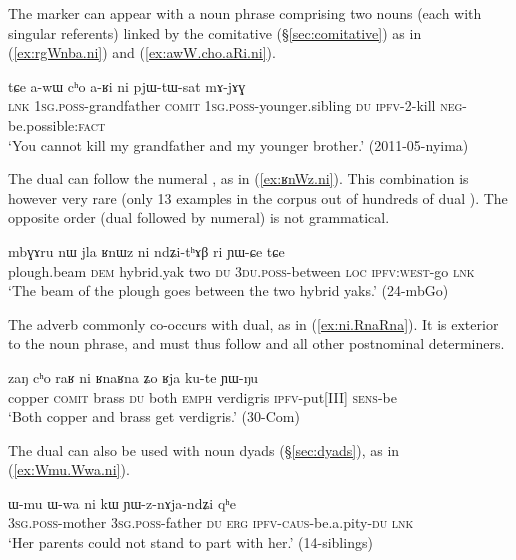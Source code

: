 The marker  can appear with a noun phrase comprising two nouns (each with singular referents) linked by the comitative  (§\ref{sec:comitative}) as in (\ref{ex:rgWnba.ni}) and (\ref{ex:awW.cho.aRi.ni}).

\begin{exe}
	\ex \label{ex:awW.cho.aRi.ni}
	\gll  tɕe a-wɯ cʰo a-ʁi ni pjɯ-tɯ-sat mɤ-jɤɣ \\
	\textsc{lnk} \textsc{1sg}.\textsc{poss}-grandfather \textsc{comit} \textsc{1sg}.\textsc{poss}-younger.sibling \textsc{du} \textsc{ipfv}-2-kill \textsc{neg}-be.possible:\textsc{fact} \\
	\glt `You cannot kill my grandfather and my younger brother.' (2011-05-nyima)
\end{exe}

The dual can follow the numeral , as in (\ref{ex:ʁnWz.ni}). This combination is however very rare (only 13 examples in the corpus out of hundreds of dual ). The opposite order (dual followed by numeral) is not grammatical.

\begin{exe}
\ex \label{ex:ʁnWz.ni}
\gll mbɣɤru nɯ jla ʁnɯz ni ndʑi-tʰɤβ ri ɲɯ-ɕe tɕe \\
plough.beam \textsc{dem} hybrid.yak two \textsc{du} \textsc{3du}.\textsc{poss}-between \textsc{loc} \textsc{ipfv}:\textsc{west}-go \textsc{lnk} \\
\glt `The beam of the plough goes between the two hybrid yaks.' (24-mbGo)
\end{exe}


The adverb  commonly co-occurs with dual, as in (\ref{ex:ni.RnaRna}). It is exterior to the noun phrase, and must thus follow  and all other postnominal determiners.

\begin{exe}
\ex \label{ex:ni.RnaRna}
\gll zaŋ cʰo raʁ ni ʁnaʁna ʑo ʁja ku-te ɲɯ-ŋu \\
copper \textsc{comit} brass \textsc{du} both \textsc{emph} verdigris \textsc{ipfv}-put[III] \textsc{sens}-be \\
\glt `Both copper and brass get verdigris.' (30-Com)
\end{exe}

The dual can also be used with noun dyads (§\ref{sec:dyads}), as in (\ref{ex:Wmu.Wwa.ni}). 

\begin{exe}
\ex \label{ex:Wmu.Wwa.ni}
\gll   ɯ-mu ɯ-wa ni kɯ ɲɯ-z-nɤja-ndʑi qʰe \\
\textsc{3sg}.\textsc{poss}-mother \textsc{3sg}.\textsc{poss}-father \textsc{du} \textsc{erg} \textsc{ipfv}-\textsc{caus}-be.a.pity-\textsc{du} \textsc{lnk} \\
\glt `Her parents could not stand to part with her.' (14-siblings) 
\end{exe}

